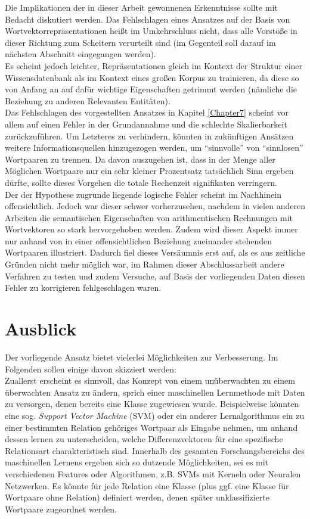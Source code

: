Die Implikationen der in dieser Arbeit gewonnenen Erkenntnisse sollte mit Bedacht diskutiert werden. Das Fehlschlagen
eines Ansatzes auf der Basis von Wortvektorrepräsentationen heißt im Umkehrschluss nicht, dass alle Vorstöße in dieser
Richtung zum Scheitern verurteilt sind (im Gegenteil soll darauf im nächsten Abschnitt eingegangen werden).\\
Es scheint jedoch leichter, Repräsentationen gleich im Kontext der Struktur einer Wissensdatenbank als im
Kontext eines großen Korpus zu trainieren, da diese so von Anfang an auf dafür wichtige Eigenschaften getrimmt werden
(nämliche die Beziehung zu anderen Relevanten Entitäten).\\

Das Fehlschlagen des vorgestellten Ansatzes in Kapitel \ref{Chapter7} scheint vor allem auf einen Fehler in der
Grundannahme und die schlechte Skalierbarkeit zurückzuführen. Um Letzteres zu verhindern, könnten in zukünftigen Ansätzen
weitere Informationsquellen hinzugezogen werden, um ``sinnvolle'' von ``sinnlosen'' Wortpaaren zu trennen. Da davon
auszugehen ist, dass in der Menge aller Möglichen Wortpaare nur ein sehr kleiner Prozentsatz tatsächlich Sinn ergeben
dürfte, sollte dieses Vorgehen die totale Rechenzeit signifikaten verringern.\\
Der der Hypothese zugrunde liegende logische Fehler scheint im Nachhinein offensichtlich. Jedoch war dieser schwer
vorherzusehen, nachdem in vielen anderen Arbeiten die semantischen Eigenschaften von arithmentischen Rechnungen mit
Wortvektoren so stark hervorgehoben werden. Zudem wird dieser Aspekt immer nur anhand von in einer offensichtlichen
Beziehung zueinander stehenden Wortpaaren illustriert. Dadurch fiel dieses Versäumnis erst auf, als es aus zeitliche Gründen
nicht mehr möglich war, im Rahmen dieser Abschlussarbeit andere Verfahren zu testen und zudem Versuche, auf Basis der
vorliegenden Daten diesen Fehler zu korrigieren fehlgeschlagen waren.

\section{Ausblick}

Der vorliegende Ansatz bietet vielerlei Möglichkeiten zur Verbesserung. Im Folgenden sollen einige davon skizziert werden:\\
Zuallerst erscheint es sinnvoll, das Konzept von einem unüberwachten zu einem überwachten Ansatz zu ändern, sprich einer
maschinellen Lernmethode mit Daten zu versorgen, denen bereits eine Klasse zugewiesen wurde. Beispielweise könnten eine
sog. \emph{Support Vector Machine} (SVM) oder ein anderer Lernalgorithmus ein zu einer bestimmten Relation gehöriges Wortpaar
als Eingabe nehmen, um anhand dessen lernen zu unterscheiden, welche Differenzvektoren für eine spezifische Relationsart
charakteristisch sind. Innerhalb des gesamten Forschungsbereichs des maschinellen Lernens ergeben sich so dutzende Möglichkeiten,
sei es mit verschiedenen Features oder Algorithmen, z.B. SVMs mit Kerneln oder Neuralen Netzwerken. Es könnte für jede
Relation eine Klasse (plus ggf. eine Klasse für Wortpaare ohne Relation) definiert werden, denen später unklassifizierte
Wortpaare zugeordnet werden.\\

